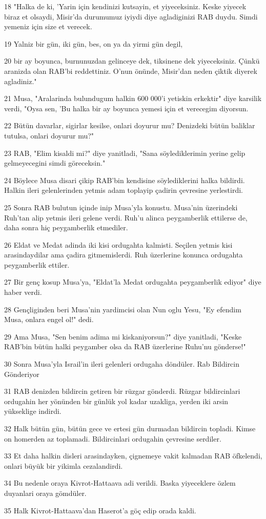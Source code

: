 \par 18 "Halka de ki, 'Yarin için kendinizi kutsayin, et yiyeceksiniz. Keske yiyecek biraz et olsaydi, Misir'da durumumuz iyiydi diye agladiginizi RAB duydu. Simdi yemeniz için size et verecek.
\par 19 Yalniz bir gün, iki gün, bes, on ya da yirmi gün degil,
\par 20 bir ay boyunca, burnunuzdan gelinceye dek, tiksinene dek yiyeceksiniz. Çünkü aranizda olan RAB'bi reddettiniz. O'nun önünde, Misir'dan neden çiktik diyerek agladiniz."
\par 21 Musa, "Aralarinda bulundugum halkin 600 000'i yetiskin erkektir" diye karsilik verdi, "Oysa sen, 'Bu halka bir ay boyunca yemesi için et verecegim diyorsun.
\par 22 Bütün davarlar, sigirlar kesilse, onlari doyurur mu? Denizdeki bütün baliklar tutulsa, onlari doyurur mu?"
\par 23 RAB, "Elim kisaldi mi?" diye yanitladi, "Sana söylediklerimin yerine gelip gelmeyecegini simdi göreceksin."
\par 24 Böylece Musa disari çikip RAB'bin kendisine söylediklerini halka bildirdi. Halkin ileri gelenlerinden yetmis adam toplayip çadirin çevresine yerlestirdi.
\par 25 Sonra RAB bulutun içinde inip Musa'yla konustu. Musa'nin üzerindeki Ruh'tan alip yetmis ileri gelene verdi. Ruh'u alinca peygamberlik ettilerse de, daha sonra hiç peygamberlik etmediler.
\par 26 Eldat ve Medat adinda iki kisi ordugahta kalmisti. Seçilen yetmis kisi arasindaydilar ama çadira gitmemislerdi. Ruh üzerlerine konunca ordugahta peygamberlik ettiler.
\par 27 Bir genç kosup Musa'ya, "Eldat'la Medat ordugahta peygamberlik ediyor" diye haber verdi.
\par 28 Gençliginden beri Musa'nin yardimcisi olan Nun oglu Yesu, "Ey efendim Musa, onlara engel ol!" dedi.
\par 29 Ama Musa, "Sen benim adima mi kiskaniyorsun?" diye yanitladi, "Keske RAB'bin bütün halki peygamber olsa da RAB üzerlerine Ruhu'nu gönderse!"
\par 30 Sonra Musa'yla Israil'in ileri gelenleri ordugaha döndüler. Rab Bildircin Gönderiyor
\par 31 RAB denizden bildircin getiren bir rüzgar gönderdi. Rüzgar bildircinlari ordugahin her yönünden bir günlük yol kadar uzakliga, yerden iki arsin yükseklige indirdi.
\par 32 Halk bütün gün, bütün gece ve ertesi gün durmadan bildircin topladi. Kimse on homerden az toplamadi. Bildircinlari ordugahin çevresine serdiler.
\par 33 Et daha halkin disleri arasindayken, çignemeye vakit kalmadan RAB öfkelendi, onlari büyük bir yikimla cezalandirdi.
\par 34 Bu nedenle oraya Kivrot-Hattaava adi verildi. Baska yiyeceklere özlem duyanlari oraya gömdüler.
\par 35 Halk Kivrot-Hattaava'dan Haserot'a göç edip orada kaldi.

